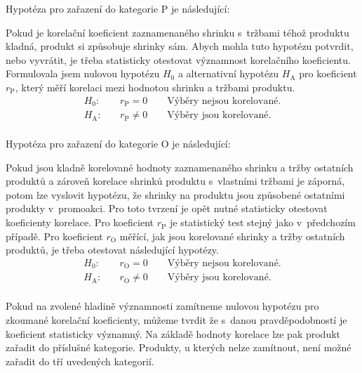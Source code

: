 Hypotéza pro zařazení do kategorie P je následující:

Pokud je korelační koeficient zaznamenaného shrinku s~tržbami téhož produktu kladná, produkt si způsobuje shrinky sám.
Abych mohla tuto hypotézu potvrdit, nebo vyvrátit, je třeba statisticky otestovat významnost korelačního koeficientu. Formulovala jsem nulovou hypotézu $H_\mathrm{0}$ a alternativní hypotézu $H_\mathrm{A}$ pro koeficient $r_\mathrm{P}$, který měří korelaci mezi hodnotou shrinku a tržbami produktu.
\begin{equation*}
    \begin{aligned}
        H_\mathrm{0}: \quad & r_\mathrm{P} = 0 \qquad \mbox{Výběry nejsou korelované.}  \\
        H_\mathrm{A}: \quad & r_\mathrm{P} \neq 0 \qquad\mbox{Výběry jsou korelované.}\\
    \end{aligned}
\end{equation*}

Hypotéza pro zařazení do kategorie O je následující:

Pokud jsou kladně korelované hodnoty zaznamenaného shrinku a tržby ostatních produktů a zároveň korelace shrinků produktu s~vlastními tržbami je záporná, potom lze vyslovit hypotézu, že shrinky na produktu jsou způsobené ostatními produkty v~promoakci.
Pro toto tvrzení je opět nutné statisticky otestovat koeficienty korelace. Pro koeficient $r_\mathrm{P}$ je statistický test stejný jako v~předchozím případě. Pro koeficient $r_\mathrm{O}$ měřící, jak jsou korelované shrinky a tržby ostatních produktů, je třeba otestovat následující hypotézy.
\begin{equation*}
    \begin{aligned}
        H_\mathrm{0}: \quad & r_\mathrm{O} = 0 \qquad \mbox{Výběry nejsou korelované.}  \\
        H_\mathrm{A}: \quad & r_\mathrm{O} \neq 0 \qquad\mbox{Výběry jsou korelované.}\\
    \end{aligned}
\end{equation*}

Pokud na zvolené hladině významnosti zamítneme nulovou hypotézu pro zkoumané korelační koeficienty, můžeme tvrdit že s~danou pravděpodobností je koeficient statisticky významný. Na základě hodnoty korelace lze pak produkt zařadit do příslušné kategorie. Produkty, u kterých nelze zamítnout, není možné zařadit do tří uvedených kategorií.

